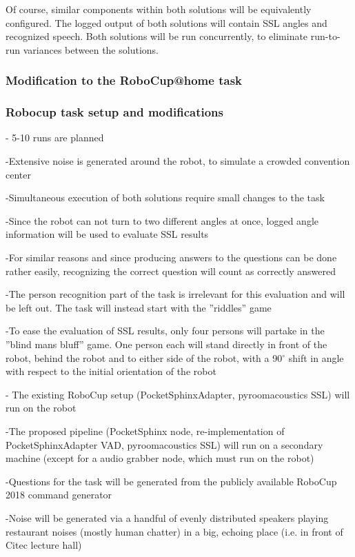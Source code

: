 Of course, similar components within both solutions will be equivalently configured.
The logged output of both solutions will contain SSL angles and recognized speech.
Both solutions will be run concurrently, to eliminate run-to-run variances between the solutions.


\subsubsection{Modification to the RoboCup@home task}



\subsubsection{Robocup task setup and modifications}
- 5-10 runs are planned

-Extensive noise is generated around the robot, to simulate a crowded convention center

-Simultaneous execution of both solutions require small changes to the task

-Since the robot can not turn to two different angles at once, logged angle information will be used to evaluate SSL results

-For similar reasons and since producing answers to the questions can be done rather easily, recognizing the correct question will count as correctly answered

-The person recognition part of the task is irrelevant for this evaluation and will be left out. The task will instead start with the ''riddles'' game

-To ease the evaluation of SSL results, only four persons will partake in the ''blind mans bluff'' game. One person each will stand directly in front of the robot, behind the robot and to either side of the robot, with a 90$^\circ$ shift in angle with respect to the initial orientation of the robot

- The existing RoboCup setup (PocketSphinxAdapter, pyroomacoustics SSL) will run on the robot

-The proposed pipeline (PocketSphinx node, re-implementation of PocketSphinxAdapter VAD, pyroomacoustics SSL) will run on a secondary machine (except for a audio grabber node, which must run on the robot)

-Questions for the task will be generated from the publicly available RoboCup 2018 command generator

-Noise will be generated via a handful of evenly distributed speakers playing restaurant noises (mostly human chatter) in a big, echoing place (i.e. in front of Citec lecture hall)

